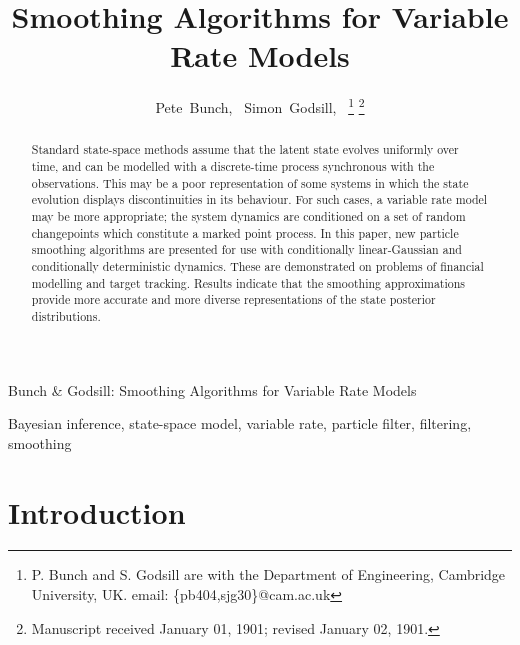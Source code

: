 \documentclass[journal]{IEEEtran}
\begin{document}
\title{Smoothing Algorithms for Variable Rate Models}

\author{Pete~Bunch,~
        Simon~Godsill,~%
\thanks{P. Bunch and S. Godsill are with the Department
of Engineering, Cambridge University, UK. email: \{pb404,sjg30\}@cam.ac.uk}%
\thanks{Manuscript received January 01, 1901; revised January 02, 1901.}}

%
{Bunch \& Godsill: Smoothing Algorithms for Variable Rate Models}

\maketitle

\begin{abstract}
Standard state-space methods assume that the latent state evolves uniformly over time, and can be modelled with a discrete-time process synchronous with the observations. This may be a poor representation of some systems in which the state evolution displays discontinuities in its behaviour. For such cases, a variable rate model may be more appropriate; the system dynamics are conditioned on a set of random changepoints which constitute a marked point process. In this paper, new particle smoothing algorithms are presented for use with conditionally linear-Gaussian and conditionally deterministic dynamics. These are demonstrated on problems of financial modelling and target tracking. Results indicate that the smoothing approximations provide more accurate and more diverse representations of the state posterior distributions.
\end{abstract}

\begin{IEEEkeywords}
Bayesian inference, state-space model, variable rate, particle filter, filtering, smoothing
\end{IEEEkeywords}



\section{Introduction}
\end{document}
